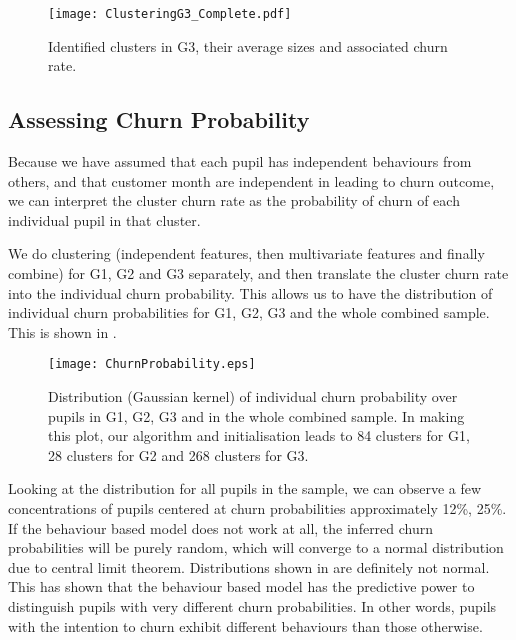 \begin{figure}[!h]
\centering
\vspace*{-0.3cm}
\texttt{[image: ClusteringG3\_Complete.pdf]}
\caption{Identified clusters in G3, their average sizes and associated churn rate.}
\label{fig:clusteringG3Complete}
\end{figure}

\subsection{Assessing Churn Probability}

Because we have assumed that each pupil has independent behaviours from others, and that customer month are independent in leading to churn outcome, we can interpret the cluster churn rate as the probability of churn of each individual pupil in that cluster.

We do clustering (independent features, then multivariate features and finally combine) for G1, G2 and G3 separately, and then translate the cluster churn rate into the individual churn probability. This allows us to have the distribution of individual churn probabilities for G1, G2, G3 and the whole combined sample. This is shown in .

\begin{figure}[!h]
\centering
\texttt{[image: ChurnProbability.eps]}
\vspace*{-0.3cm}
\caption{Distribution (Gaussian kernel) of individual churn probability over pupils in G1, G2, G3 and in the whole combined sample. In making this plot, our algorithm and initialisation leads to 84 clusters for G1, 28 clusters for G2 and 268 clusters for G3.}
\label{fig:churnProb}
\end{figure}

Looking at the distribution for all pupils in the sample, we can observe a few concentrations of pupils centered at churn probabilities approximately 12\%, 25\%. If the behaviour based model does not work at all, the inferred churn probabilities will be purely random, which will converge to a normal distribution due to central limit theorem. Distributions shown in  are definitely not normal. This has shown that the behaviour based model has the predictive power to distinguish pupils with very different churn probabilities. In other words, pupils with the intention to churn exhibit different behaviours than those otherwise.

